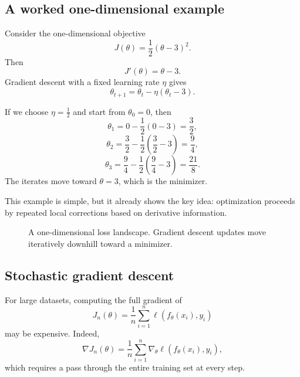 \subsection*{A worked one-dimensional example}

Consider the one-dimensional objective
\[
J(\theta)=\frac12(\theta-3)^2.
\]
Then
\[
J'(\theta)=\theta-3.
\]
Gradient descent with a fixed learning rate $\eta$ gives
\[
\theta_{t+1}=\theta_t-\eta(\theta_t-3).
\]

If we choose $\eta=\frac12$ and start from $\theta_0=0$, then
\[
\theta_1=0-\frac12(0-3)=\frac32,
\]
\[
\theta_2=\frac32-\frac12\left(\frac32-3\right)=\frac94,
\]
\[
\theta_3=\frac94-\frac12\left(\frac94-3\right)=\frac{21}{8}.
\]
The iterates move toward $\theta=3$, which is the minimizer.

This example is simple, but it already shows the key idea: optimization proceeds by repeated local corrections based on derivative information.

\begin{figure}[tbp]
\centering
{}
\caption{A one-dimensional loss landscape. Gradient descent updates move iteratively downhill toward a minimizer.}
\end{figure}

\subsection*{Stochastic gradient descent}

For large datasets, computing the full gradient of
\[
J_n(\theta)=\frac1n\sum_{i=1}^n \ell(f_\theta(x_i),y_i)
\]
may be expensive. Indeed,
\[
\nabla J_n(\theta)=\frac1n\sum_{i=1}^n \nabla_\theta \ell(f_\theta(x_i),y_i),
\]
which requires a pass through the entire training set at every step.

